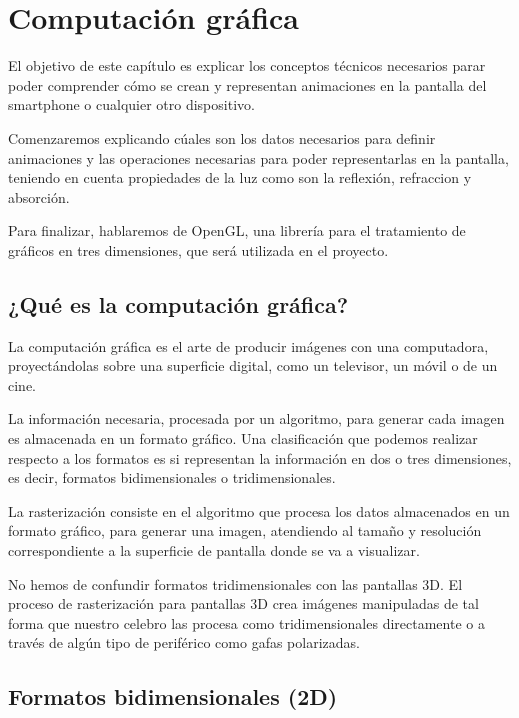 \chapter{Computación gráfica}

El objetivo de este capítulo es explicar los conceptos técnicos necesarios parar poder comprender cómo se crean y representan animaciones en la pantalla del smartphone o cualquier otro dispositivo.
\newline

Comenzaremos explicando cúales son los datos necesarios para definir animaciones y las operaciones necesarias para poder representarlas en la pantalla, teniendo en cuenta propiedades de la luz como son la reflexión, refraccion y absorción.
\newline

Para finalizar, hablaremos de OpenGL, una librería para el tratamiento de gráficos en tres dimensiones, que será utilizada en el proyecto.  
\newpage


\section{¿Qué es la computación gráfica?}

La computación gráfica es el arte de producir imágenes con una computadora, proyectándolas sobre una superficie digital, como un televisor, un móvil  o de un cine.
\newline

La información necesaria, procesada por un algoritmo, para generar cada imagen es almacenada en un formato gráfico. Una clasificación que podemos realizar respecto a los formatos es si representan la información en dos o tres dimensiones, es decir, formatos bidimensionales o tridimensionales.
\newline 

La rasterización consiste en el algoritmo que procesa los datos almacenados en un formato gráfico, para generar una imagen, atendiendo al tamaño y  resolución correspondiente a la superficie de pantalla donde se va a visualizar.
\newline

No hemos de confundir formatos tridimensionales con las pantallas 3D. El proceso de rasterización para pantallas 3D crea imágenes manipuladas de tal forma que nuestro celebro las procesa como tridimensionales directamente o a través de algún tipo de periférico como gafas polarizadas. 

\section{Formatos bidimensionales (2D)}

